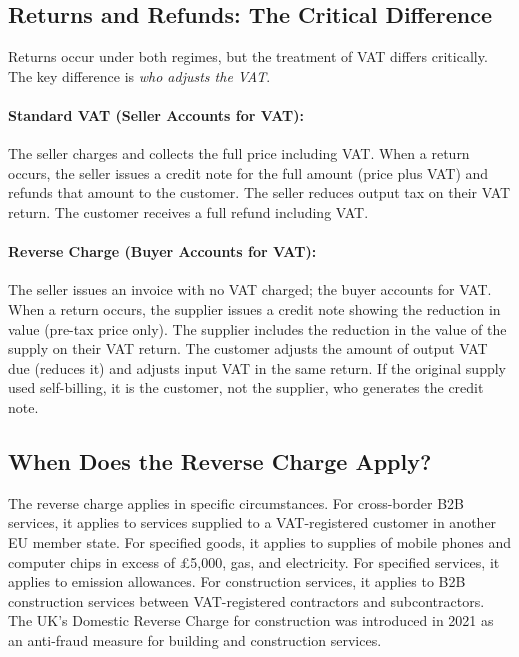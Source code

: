 \documentclass[11pt]{article}
\begin{document}
\subsection{Returns and Refunds: The Critical Difference}

Returns occur under both regimes, but the treatment of VAT differs critically. The key difference is \emph{who adjusts the VAT}.

\paragraph{Standard VAT (Seller Accounts for VAT):}

The seller charges and collects the full price including VAT. When a return occurs, the seller issues a credit note for the full amount (price plus VAT) and refunds that amount to the customer. The seller reduces output tax on their VAT return. The customer receives a full refund including VAT.

\paragraph{Reverse Charge (Buyer Accounts for VAT):}

The seller issues an invoice with no VAT charged; the buyer accounts for VAT. When a return occurs, the supplier issues a credit note showing the reduction in value (pre-tax price only). The supplier includes the reduction in the value of the supply on their VAT return. The customer adjusts the amount of output VAT due (reduces it) and adjusts input VAT in the same return. If the original supply used self-billing, it is the customer, not the supplier, who generates the credit note.

\subsection{When Does the Reverse Charge Apply?}

The reverse charge applies in specific circumstances. For cross-border B2B services, it applies to services supplied to a VAT-registered customer in another EU member state. For specified goods, it applies to supplies of mobile phones and computer chips in excess of £5,000, gas, and electricity. For specified services, it applies to emission allowances. For construction services, it applies to B2B construction services between VAT-registered contractors and subcontractors. The UK's Domestic Reverse Charge for construction was introduced in 2021 as an anti-fraud measure for building and construction services.
\end{document}
